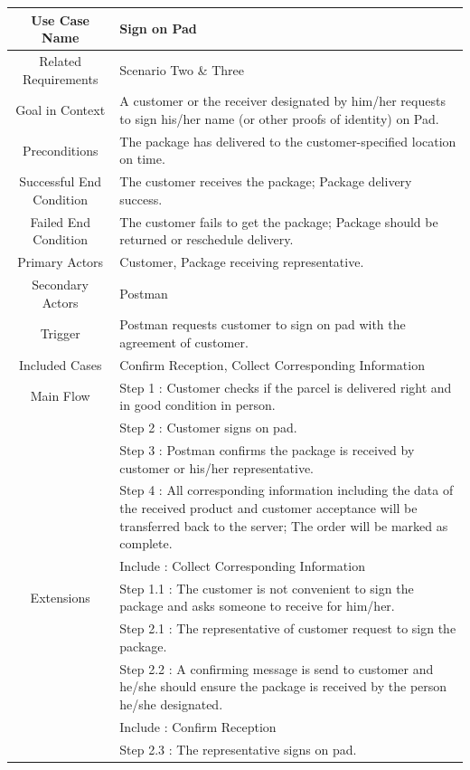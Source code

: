\documentclass[12pt]{scrreprt}
\begin{document}
\begin{table}
  \centering
  \begin{tabular}{| c | p{11cm} |}
    \hline
    Use Case Name & Sign on Pad\\
    \hline
    Related Requirements & Scenario Two \& Three\\
    \hline
    Goal in Context & A customer or the receiver designated by him/her requests
    to sign his/her name (or other proofs of identity) on Pad.\\
    \hline
    Preconditions & The package has delivered to the customer-specified
    location on time.\\
    \hline
    Successful End Condition & The customer receives the package; Package
    delivery success.\\
    \hline
    Failed End Condition & The customer fails to get the package; Package
    should be returned or reschedule delivery.\\
    \hline
    Primary Actors & Customer, Package receiving representative.\\
    \hline
    Secondary Actors & Postman\\
    \hline
    Trigger & Postman requests customer to sign on pad with the agreement of
    customer.\\
    \hline
    Included Cases & Confirm Reception, Collect Corresponding Information\\
    \hline
    Main Flow & Step 1 : Customer checks if the parcel is delivered right
    and in good condition in person.\\
    & Step 2 : Customer signs on pad.\\
    & Step 3 : Postman confirms the package is received by customer or his/her
    representative.\\
    & Step 4 : All corresponding information including the data of the received
    product and customer acceptance will be transferred back to the server;
    The order will be marked as complete.\\
    & Include : Collect Corresponding Information\\
    \hline
    Extensions & Step 1.1 : The customer is not convenient to sign the package
    and asks someone to receive for him/her.\\
    & Step 2.1 : The representative of customer request to sign the package.\\
    & Step 2.2 : A confirming message is send to customer and he/she should
    ensure the package is received by the person he/she designated.\\
    & Include : Confirm Reception\\
    & Step 2.3 : The representative signs on pad.\\
    \hline
  \end{tabular}
\end{table}
\end{document}
